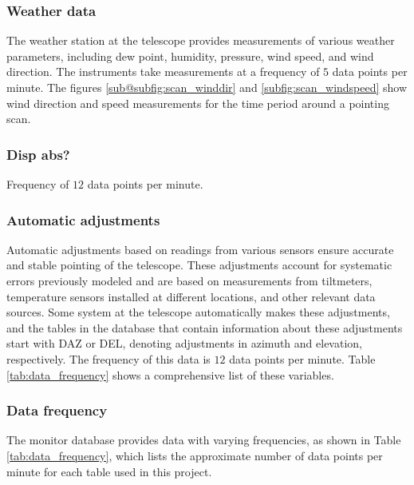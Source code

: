 \subsubsection{Weather data}
The weather station at the telescope provides measurements of various weather parameters, including dew point, humidity, pressure, wind speed, and wind direction.
The instruments take measurements at a frequency of $5$ data points per minute.
The figures \ref{sub@subfig:scan_winddir} and \ref{subfig:scan_windspeed} show wind direction and speed measurements for the time period around a pointing scan.


\subsubsection{Disp abs?}

Frequency of $12$ data points per minute.

\subsubsection{Automatic adjustments}
Automatic adjustments based on readings from various sensors ensure accurate and stable pointing of the telescope.
These adjustments account for systematic errors previously modeled and are based on measurements from tiltmeters, temperature sensors installed at different locations, and other relevant data sources.
Some system at the telescope automatically makes these adjustments, and the tables in the database that contain information about these adjustments start with DAZ or DEL, denoting adjustments in azimuth and elevation, respectively.
The frequency of this data is $12$ data points per minute.
Table \ref{tab:data_frequency} shows a comprehensive list of these variables.

\subsubsection{Data frequency}
The monitor database provides data with varying frequencies, as shown in Table \ref{tab:data_frequency},
which lists the approximate number of data points per minute for each table used in this project.

